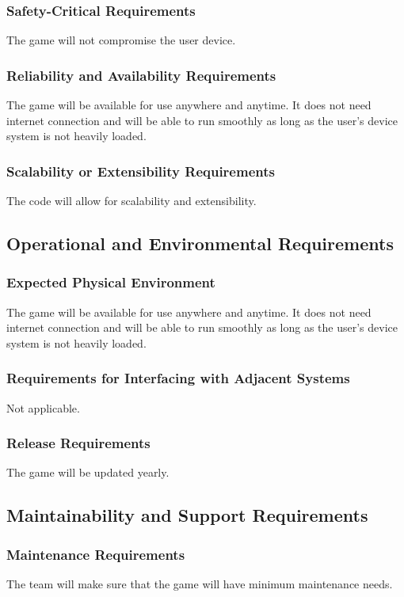 \documentclass{article}
\begin{document}
\subsubsection{Safety-Critical Requirements}
The game will not compromise the user device. %
\subsubsection{Reliability and Availability Requirements}
The game will be available for use anywhere and anytime. It does not need internet connection and will be able to run smoothly as long as the user’s device system is not heavily loaded. %
\subsubsection{Scalability or Extensibility Requirements}
The code will allow for scalability and extensibility. %

\subsection{Operational and Environmental Requirements}
\subsubsection{Expected Physical Environment}
The game will be available for use anywhere and anytime. It does not need internet connection and will be able to run smoothly as long as the user’s device system is not heavily loaded.
\subsubsection{Requirements for Interfacing with Adjacent Systems}
Not applicable.%
\subsubsection{Release Requirements}
The game will be updated yearly.

\subsection{Maintainability and Support Requirements}
\subsubsection{ Maintenance Requirements}
The team will make sure that the game will have minimum maintenance needs. %
\end{document}
